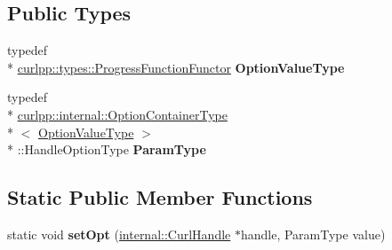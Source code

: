 \subsection*{Public Types}
\begin{DoxyCompactItemize}
\item 
\hypertarget{classcurlpp_1_1internal_1_1OptionSetter_3_01curlpp_1_1types_1_1ProgressFunctionFunctor_00_01CURLOPT__PROGRESSFUNCTION_01_4_a8dbc374b2996466815b65bd88e0f1a6d}{typedef \\*
\hyperlink{classutilspp_1_1Functor}{curlpp\-::types\-::\-Progress\-Function\-Functor} {\bfseries Option\-Value\-Type}}\label{classcurlpp_1_1internal_1_1OptionSetter_3_01curlpp_1_1types_1_1ProgressFunctionFunctor_00_01CURLOPT__PROGRESSFUNCTION_01_4_a8dbc374b2996466815b65bd88e0f1a6d}

\item 
\hypertarget{classcurlpp_1_1internal_1_1OptionSetter_3_01curlpp_1_1types_1_1ProgressFunctionFunctor_00_01CURLOPT__PROGRESSFUNCTION_01_4_ad09a6c9813c5db0b603af5ef4b6a84ae}{typedef \\*
\hyperlink{structcurlpp_1_1internal_1_1OptionContainerType}{curlpp\-::internal\-::\-Option\-Container\-Type}\\*
$<$ \hyperlink{classutilspp_1_1Functor}{Option\-Value\-Type} $>$\\*
\-::Handle\-Option\-Type {\bfseries Param\-Type}}\label{classcurlpp_1_1internal_1_1OptionSetter_3_01curlpp_1_1types_1_1ProgressFunctionFunctor_00_01CURLOPT__PROGRESSFUNCTION_01_4_ad09a6c9813c5db0b603af5ef4b6a84ae}

\end{DoxyCompactItemize}
\subsection*{Static Public Member Functions}
\begin{DoxyCompactItemize}
\item 
\hypertarget{classcurlpp_1_1internal_1_1OptionSetter_3_01curlpp_1_1types_1_1ProgressFunctionFunctor_00_01CURLOPT__PROGRESSFUNCTION_01_4_aebfa0deb2d658eca315f3f3d1892f2bf}{static void {\bfseries set\-Opt} (\hyperlink{classcurlpp_1_1internal_1_1CurlHandle}{internal\-::\-Curl\-Handle} $\ast$handle, Param\-Type value)}\label{classcurlpp_1_1internal_1_1OptionSetter_3_01curlpp_1_1types_1_1ProgressFunctionFunctor_00_01CURLOPT__PROGRESSFUNCTION_01_4_aebfa0deb2d658eca315f3f3d1892f2bf}

\end{DoxyCompactItemize}


